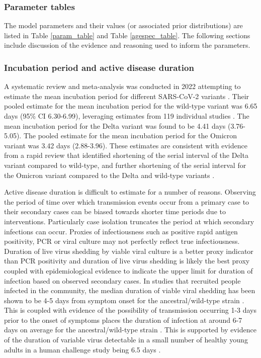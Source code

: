 \subsubsection{Parameter tables}
The model parameters and their values (or associated prior distributions) are listed in Table \ref{param_table} and Table \ref{agespec_table}. The
following sections include discussion of the evidence and reasoning used to inform the parameters.

\renewcommand{\arraystretch}{1.3}
 

\renewcommand{\arraystretch}{1.3}
 


\subsubsection{Incubation period and active disease duration}
A systematic review and meta-analysis was conducted in 2022 attempting to estimate the mean incubation period for 
different SARS-CoV-2 variants \cite{wu2022}. Their pooled estimate for the mean incubation period for the wild-type 
variant was 6.65 days (95\% CI 6.30-6.99), leveraging estimates from 119 individual studies \cite{wu2022}.
The mean incubation period for the Delta variant was found to be 4.41 days (3.76-5.05). 
The pooled estimate for the mean incubation period for the Omicron variant was 3.42 days (2.88-3.96). 
These estimates are consistent with evidence from a rapid review that identified shortening of the serial interval of the 
Delta variant compared to wild-type, and further shortening of the serial interval for the Omicron variant compared to the 
Delta and wild-type variants \cite{madewell2023}.

Active disease duration is difficult to estimate for a number of reasons. Observing the period of time over which transmission events
occur from a primary case to their secondary cases can be biased towards shorter time periods due to interventions. Particularly 
case isolation truncates the period at which secondary infections can occur. Proxies of infectiousness such as positive rapid 
antigen positivity, PCR or viral culture may not perfectly reflect true infectiousness. Duration of live virus shedding by viable 
viral culture is a better proxy indicator than PCR positivity and duration of live virus shedding is likely the best proxy coupled 
with epidemiological evidence to indicate the upper limit for duration of infection based on observed secondary cases.
In studies that recruited people infected in the community, the median duration of viable viral shedding has been shown to be 
4-5 days from symptom onset for the ancestral/wild-type strain \cite{singanayagam2020, hakki2022}. This is coupled with evidence of 
the possibility of transmission occurring 1-3 days prior to the onset of symptoms places the duration of infection at around 6-7 days 
on average for the ancestral/wild-type strain \cite{he2020}. This is supported by evidence of the duration of variable virus 
detectable in a small number of healthy young adults in a human challenge study being 6.5 days \cite{killingley2022}. 

